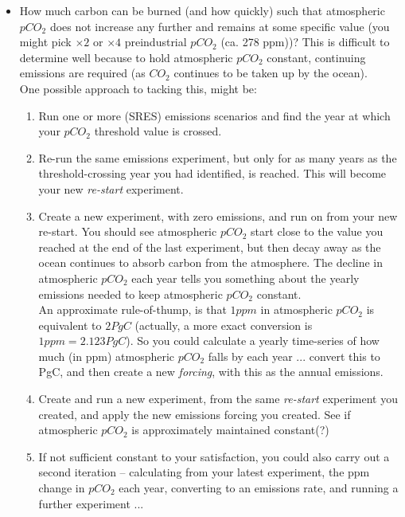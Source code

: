 \documentclass[11pt,fleqn]{book} %
\begin{document}
\begin{itemize}[noitemsep]

\vspace{1mm}
\item How much carbon can  be burned (and how quickly) such that atmospheric \(pCO_{2}\) does not increase any further and remains at some specific value (you might pick \(\times2\) or \(\times4\) preindustrial \(pCO_{2}\) (ca. 278 ppm))? This is difficult to determine well because to hold atmospheric \(pCO_{2}\)  constant, continuing emissions are required (as \(CO_{2}\) continues to be taken up by the ocean).
\vspace{1mm} 
\\One possible approach to tacking this, might be:
\vspace{1mm} 
\begin{enumerate}[noitemsep]
\item Run one or more (SRES) emissions scenarios and find the year at which your \(pCO_{2}\) threshold value is crossed. 
\item Re-run the same emissions experiment, but only for as many years as the threshold-crossing year you had identified, is reached. This will become your new \textit{re-start} experiment.
\item Create a new experiment, with zero emissions, and run on from your new re-start. You should see atmospheric \(pCO_{2}\) start close to the value you reached at the end of the last experiment, but then decay away as the ocean continues to absorb carbon from the atmosphere. The decline in atmospheric \(pCO_{2}\) each year tells you something about the yearly emissions needed to keep atmospheric \(pCO_{2}\) constant.
\\An approximate rule-of-thump, is that \(1ppm\) in atmospheric \(pCO_{2}\) is equivalent to \(2 PgC\) (actually, a more exact conversion is \(1 ppm = 2.123 PgC\)). So you could calculate a yearly time-series of how much (in ppm) atmospheric \(pCO_{2}\) falls by each year ... convert this to PgC, and then create a new \textit{forcing}, with this as the annual emissions.
\item Create and run a new experiment, from the same \textit{re-start} experiment you created, and apply the new emissions forcing you created. See if atmospheric \(pCO_{2}\) is approximately maintained constant(?)  
\item If not sufficient constant to your satisfaction, you could also carry out a second iteration -- calculating from your latest experiment, the ppm change in \(pCO_{2}\) each year, converting to an emissions rate, and running a further experiment ...

\end{enumerate}
\end{itemize}
\end{document}
